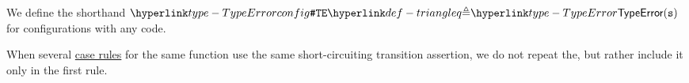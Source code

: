 \BackupOriginalType{
\[
  \typeerror \triangleq \{\TypeErrorVal{\vs} \;|\; \vs \in \Strings \}
\]
}
\hypertarget{type-TypeErrorconfig}{}
We define the shorthand $\TypeErrorConfig \triangleq \TypeError(\vs)$ for \typingerrorterm{} configurations with any code.

When several \hyperlink{def-caserules}{case rules} for the same function use the same short-circuiting transition assertion,
we do not repeat the\ProseOrTypeError, but rather include it only in the first rule.
